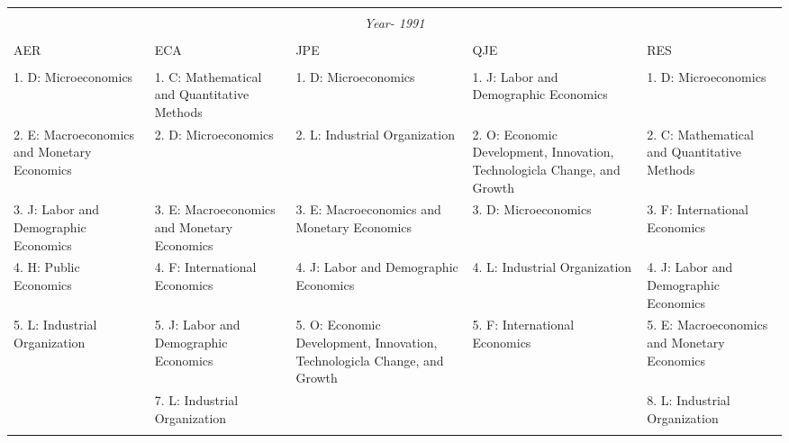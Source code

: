 
\begin{table}[h] \centering 
  \caption{} 
  \label{} 
\begin{adjustbox}{max width=\textwidth}
\begin{tabular}{@{\extracolsep{5pt}} lllll} 
\\[-1.8ex]\hline 
\hline \\[-1.8ex] \multicolumn{5}{c}{\textit{Year- 1991}} \\
 \cline{1-5} \\
AER & ECA & JPE & QJE & RES \\ 
\hline \\[-1.8ex] 
1. D: Microeconomics & 1. C: Mathematical and Quantitative Methods & 1. D: Microeconomics & 1. J: Labor and Demographic Economics & 1. D: Microeconomics \\ 
2. E: Macroeconomics and Monetary Economics & 2. D: Microeconomics & 2. L: Industrial Organization & 2. O: Economic Development, Innovation, Technologicla Change, and Growth & 2. C: Mathematical and Quantitative Methods \\ 
3. J: Labor and Demographic Economics & 3. E: Macroeconomics and Monetary Economics & 3. E: Macroeconomics and Monetary Economics & 3. D: Microeconomics & 3. F: International Economics \\ 
4. H: Public Economics & 4. F: International Economics & 4. J: Labor and Demographic Economics & 4. L: Industrial Organization & 4. J: Labor and Demographic Economics \\ 
5. L: Industrial Organization & 5. J: Labor and Demographic Economics & 5. O: Economic Development, Innovation, Technologicla Change, and Growth & 5. F: International Economics & 5. E: Macroeconomics and Monetary Economics \\ 
 & 7. L: Industrial Organization &  &  & 8. L: Industrial Organization \\ 
\hline \\[-1.8ex] 
\end{tabular} 
\end{adjustbox}
\end{table} 
